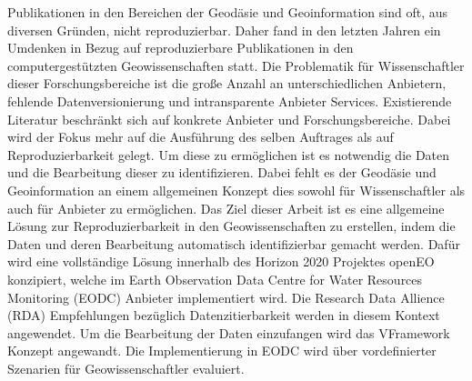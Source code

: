 \documentclass[draft,final]{vutinfth} %
\begin{document}
\begin{kurzfassung}
Publikationen in den Bereichen der Geodäsie und Geoinformation sind oft, aus diversen Gründen, nicht reproduzierbar. Daher fand in den letzten Jahren ein Umdenken in Bezug auf reproduzierbare Publikationen in den computergestützten Geowissenschaften statt. Die Problematik für Wissenschaftler dieser Forschungsbereiche ist die große Anzahl an unterschiedlichen Anbietern, fehlende Datenversionierung und intransparente Anbieter Services. Existierende Literatur beschränkt sich auf konkrete Anbieter und Forschungsbereiche. Dabei wird der Fokus mehr auf die Ausführung des selben Auftrages als auf Reproduzierbarkeit gelegt. Um diese zu ermöglichen ist es notwendig die Daten und die Bearbeitung dieser zu identifizieren. Dabei fehlt es der Geodäsie und Geoinformation an einem allgemeinen Konzept dies sowohl für Wissenschaftler als auch für Anbieter zu ermöglichen. Das Ziel dieser Arbeit ist es eine allgemeine Lösung zur Reproduzierbarkeit in den Geowissenschaften zu erstellen, indem die Daten und deren Bearbeitung automatisch identifizierbar gemacht werden. Dafür wird eine vollständige Lösung innerhalb des Horizon 2020 Projektes openEO konzipiert, welche im Earth Observation Data Centre for Water Resources Monitoring (EODC) Anbieter implementiert wird. Die Research Data Allience (RDA) Empfehlungen bezüglich Datenzitierbarkeit werden in diesem Kontext angewendet. Um die Bearbeitung der Daten einzufangen wird das VFramework Konzept angewandt. Die Implementierung in EODC wird über vordefinierter Szenarien für Geowissenschaftler evaluiert.    
\end{kurzfassung}
\end{document}
